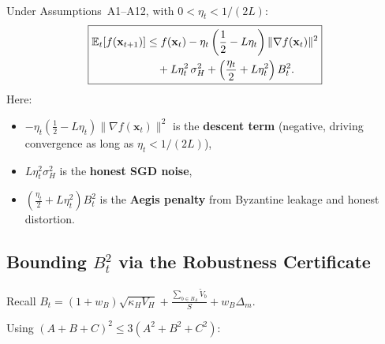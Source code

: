 \documentclass[../main]{subfiles}
\begin{document}
\begin{theorem}
\hfill \\\label{thm:one_step}
Under Assumptions~A1--A12, with $0 < \eta_t < 1/(2L)$:
\begin{equation}
\boxed{
\begin{aligned}
    \mathbb{E}_t[f(\mathbf{x}_{t+1})] &\leq f(\mathbf{x}_t)
    - \eta_t\left(\frac{1}{2} - L\eta_t\right)\|\nabla f(\mathbf{x}_t)\|^2 \\
    &\quad + L\eta_t^2\,\sigma_H^2
    + \left(\frac{\eta_t}{2} + L\eta_t^2\right) B_t^2.
\end{aligned}
}
\label{eq:one_step}
\end{equation}
Here:
\begin{itemize}
    \item $-\eta_t(\frac{1}{2} - L\eta_t)\|\nabla f(\mathbf{x}_t)\|^2$ is the \textbf{descent term} (negative, driving convergence as long as $\eta_t < 1/(2L)$),
    \item $L\eta_t^2\sigma_H^2$ is the \textbf{honest SGD noise},
    \item $(\frac{\eta_t}{2} + L\eta_t^2) B_t^2$ is the \textbf{Aegis penalty} from Byzantine leakage and honest distortion.
\end{itemize}
\end{theorem}

\subsection{Bounding \texorpdfstring{$B_t^2$}{B\_t\textasciicircum 2} via the Robustness Certificate}

Recall $B_t = (1+w_B)\sqrt{\kappa_H V_H} + \frac{\sum_{b \in B_A}\widetilde{V}_b}{S} + w_B\Delta_m$.

Using $(A + B + C)^2 \leq 3(A^2 + B^2 + C^2)$:
\end{document}
